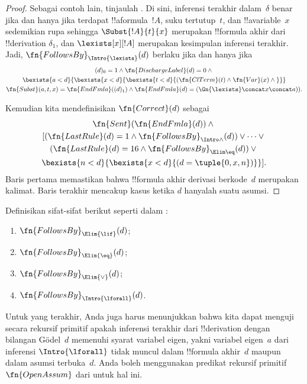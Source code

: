 \documentclass[../../../include/open-logic-section]{subfiles}
\begin{document}
\begin{proof}
  Sebagai contoh lain, tinjaulah \Intro{\lexists}. Di sini, inferensi
  terakhir dalam~$\delta$ benar jika dan hanya jika terdapat !!a{formula}~$!A$,
  suku tertutup~$t$, dan !!a{variable}~$x$ sedemikian rupa sehingga
  $\Subst{!A}{t}{x}$ merupakan !!{formula} akhir dari !!{derivation}
  $\delta_1$, dan $\lexists[x][!A]$ merupakan kesimpulan inferensi terakhir.
  Jadi, $\fn{FollowsBy}_{\Intro{\lexists}}(d)$ berlaku jika dan hanya jika
  \begin{multline*}
    (d)_0 = 1 \land \fn{DischargeLabel}(d) = 0 \land {} \\
    \bexists{a < d}{\bexists{x<d}{\bexists{t<d}{
          (\fn{ClTerm}(t) \land \fn{Var}(x)  \land {}}}}\\
    \fn{Subst}(a,t,x) = \fn{EndFmla}((d)_1) \land
    \fn{EndFmla}(d) = (\Gn{\lexists} \concat x \concat a)).
  \end{multline*}

  Kemudian kita mendefinisikan $\fn{Correct}(d)$ sebagai
  \begin{multline*}
    \fn{Sent}(\fn{EndFmla}(d)) \land {}\\
    [(\fn{LastRule}(d) = 1 \land
    \fn{FollowsBy}_{\Intro\land}(d)) \lor \dots \lor {}\\
    (\fn{LastRule}(d) = 16 \land \fn{FollowsBy}_{\Elim\eq}(d)) \lor {}\\
    \bexists{n<d}{\bexists{x<d}{(d = \tuple{0, x, n})}}].
  \end{multline*}
  Baris pertama memastikan bahwa !!{formula} akhir derivasi berkode~$d$
  merupakan kalimat.
  Baris terakhir mencakup kasus ketika $d$ hanyalah suatu asumsi.
\end{proof}

\begin{prob}
  Definisikan sifat-sifat berikut seperti dalam
  :
  \begin{enumerate}
  \item $\fn{FollowsBy}_{\Elim{\lif}}(d)$;
  \item $\fn{FollowsBy}_{\Elim{\eq}}(d)$;
  \item $\fn{FollowsBy}_{\Elim{\lor}}(d)$;
  \item $\fn{FollowsBy}_{\Intro{\lforall}}(d)$.
  \end{enumerate}
  Untuk yang terakhir, Anda juga harus menunjukkan bahwa kita dapat menguji
  secara rekursif primitif apakah inferensi terakhir dari !!{derivation}
  dengan bilangan G\"odel~$d$ memenuhi syarat variabel eigen, yakni variabel
  eigen~$a$ dari inferensi $\Intro{\lforall}$ tidak muncul dalam !!{formula}
  akhir~$d$ maupun dalam asumsi terbuka~$d$. Anda boleh menggunakan predikat
  rekursif primitif $\fn{OpenAssum}$ dari
   untuk hal ini.
\end{prob}
\end{document}
